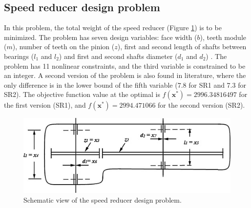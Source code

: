 
\subsection*{Speed reducer design problem}

In this problem, the total weight of the speed reducer (Figure \ref{fig:SR}) is to be minimized. The problem has seven design variables: face width ($b$), teeth module ($m$), number of teeth on the pinion ($z$), first and second length of shafts between bearings ($l_1$ and $l_2$) and first and second shafts diameter ($d_1$ and $d_2$) \citep{SR}. The problem has 11 nonlinear constraints, and the third variable is constrained to be an integer. A second version of the problem is also found in literature, where the only difference is in the lower bound of the fifth variable (7.8 for SR1 and 7.3 for SR2). The objective function value at the optimal is $f(\bm{x}^*) = 2996.34816497$ for the first version (SR1), and $f(\bm{x}^*) = 2994.471066$ for the second version (SR2). \\


\begin{figure}[h]
    \begin{center}
    \includegraphics[scale=0.6]{Imgs/SR.jpg}
    \end{center}
    \captionsetup{justification=centering}
    \caption{Schematic view of the speed reducer design problem.}\label{fig:SR}
\end{figure}

